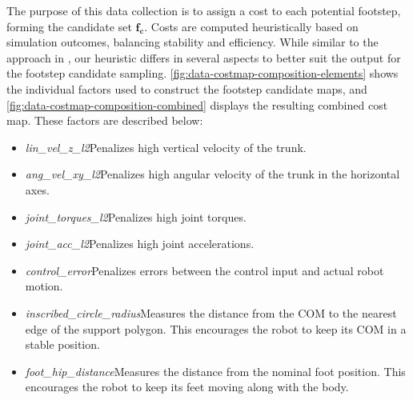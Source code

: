 The purpose of this data collection is to assign a cost to each
potential footstep, forming the candidate set $\mathbf{f_c}$. Costs
are computed heuristically based on simulation outcomes, balancing
stability and efficiency. While similar to the approach in
\cite{bratta_contactnet_2024}, our heuristic differs in several
aspects to better suit the output for the footstep candidate sampling.
\autoref{fig:data-costmap-composition-elements} shows the individual
factors used to construct the footstep candidate maps, and
\autoref{fig:data-costmap-composition-combined} displays the
resulting combined cost map. These factors are described below:

\begin{itemize}
  \item \textit{lin\_vel\_z\_l2}\textemdash Penalizes high vertical
    velocity of the trunk.
  \item \textit{ang\_vel\_xy\_l2}\textemdash Penalizes high angular
    velocity of the trunk in     the horizontal axes.
  \item \textit{joint\_torques\_l2}\textemdash Penalizes high joint torques.
  \item \textit{joint\_acc\_l2}\textemdash Penalizes high joint accelerations.
  \item \textit{control\_error}\textemdash Penalizes errors between the control
    input and actual robot motion.
  \item \textit{inscribed\_circle\_radius}\textemdash Measures the distance
    from the COM to the nearest edge of the support polygon. This
    encourages the robot to keep its COM in a stable position.
  \item \textit{foot\_hip\_distance}\textemdash Measures the distance from
    the nominal foot position. This encourages the robot to keep its
    feet     moving along with the body.
\end{itemize}

